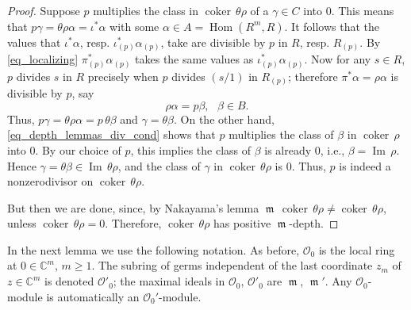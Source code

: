 \documentclass{amsart}
\numberwithin{equation}{section}
\theoremstyle{definition}
\theoremstyle{plain}
\theoremstyle{remark}
\begin{document}
\begin{proof}
Suppose $p$ multiplies the class  in ${{\mathop{\mathrm{coker\,}}}} \theta\rho$ of a $\gamma\in C$
into $0$. This means that $p\gamma=\theta\rho\alpha=\iota^*\alpha$
with some $\alpha\in A={{\mathop{\mathrm{Hom}}}}(R^m,R)$. It follows that the values that 
$\iota^*\alpha$, resp. $\iota^*_{(p)}\alpha_{(p)}$, take are divisible by $p$ in $R$,
resp. $R_{(p)}$. By \eqref{eq_localizing} $\pi_{(p)}^*\alpha_{(p)}$ takes the same values 
as $\iota_{(p)}^*\alpha_{(p)}$. Now for any $s\in R$, $p$ divides $s$ in $R$ precisely
when $p$ divides $(s/1)$ in $R_{(p)}$;
therefore $\pi^*\alpha=\rho\alpha$ is divisible by $p$, say
\begin{equation}
\label{eq_depth_lemmas_div_cond}
\rho\alpha=p\beta, \text{ }\beta\in B.
\end{equation}
Thus, $p\gamma=\theta\rho\alpha=p\,\theta\beta$ and $\gamma=\theta\beta$. On the other hand,
\eqref{eq_depth_lemmas_div_cond} shows that $p$ multiplies the class of $\beta$
in ${{\mathop{\mathrm{coker\,}}}} \rho$ into $0$.
By our choice of $p$, this implies the class of $\beta$ is already $0$,
i.e., $\beta={{\mathop{\mathrm{Im\,}}}}\rho$. Hence $\gamma=\theta\beta\in{{\mathop{\mathrm{Im\,}}}}\theta\rho$,
and the class of $\gamma$ in ${{\mathop{\mathrm{coker\,}}}} \theta\rho$ is $0$.
Thus, $p$ is indeed a nonzerodivisor on ${{\mathop{\mathrm{coker\,}}}} \theta\rho$.

But then we are done, since, 
by Nakayama's lemma ${{\mathop{\mathfrak{m}}}}\,{{\mathop{\mathrm{coker\,}}}}\theta\rho\not={{\mathop{\mathrm{coker\,}}}}\theta\rho$,
unless ${{\mathop{\mathrm{coker\,}}}}\theta\rho=0$.
Therefore, ${{\mathop{\mathrm{coker\,}}}} \theta\rho$ has  positive 
${{\mathop{\mathfrak{m}}}}$-depth.
\end{proof}

In the next lemma we use the following notation. As before, ${\ensuremath{\mathcal{{O}}}}_0$
is the local ring at $0\in\mathbb{C}^m$, $m\geq1$.
The subring of germs independent of the last coordinate $z_m$ of 
$z\in\mathbb{C}^m$ is denoted ${\ensuremath{\mathcal{{O}}}}'_0$;
the maximal ideals in ${\ensuremath{\mathcal{{O}}}}_0$, ${\ensuremath{\mathcal{{O}}}}'_0$ are ${{\mathop{\mathfrak{m}}}}$, ${{\mathop{\mathfrak{m}}}}'$.
Any ${\ensuremath{\mathcal{{O}}}}_0$-module is automatically an ${\ensuremath{\mathcal{{O}}}}_0'$-module.
\end{document}
